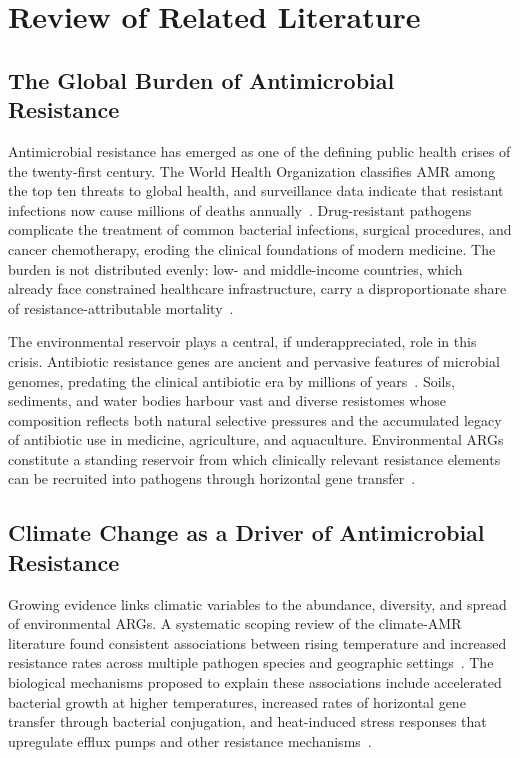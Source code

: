\documentclass[12pt,a4paper]{article}
\begin{document}
\section{Review of Related Literature}\label{rrl}

\subsection{The Global Burden of Antimicrobial Resistance}

Antimicrobial resistance has emerged as one of the defining public health
crises of the twenty-first century.
The World Health Organization classifies AMR among the top ten threats to
global health, and surveillance data indicate that resistant infections now
cause millions of deaths annually~\cite{WHO2023}.
Drug-resistant pathogens complicate the treatment of common bacterial
infections, surgical procedures, and cancer chemotherapy, eroding the
clinical foundations of modern medicine.
The burden is not distributed evenly: low- and middle-income countries,
which already face constrained healthcare infrastructure, carry a
disproportionate share of resistance-attributable mortality~\cite{LancetAMR2024}.

The environmental reservoir plays a central, if underappreciated, role in
this crisis.
Antibiotic resistance genes are ancient and pervasive features of
microbial genomes, predating the clinical antibiotic era by millions of
years~\cite{Allen2010}.
Soils, sediments, and water bodies harbour vast and diverse resistomes
whose composition reflects both natural selective pressures and the
accumulated legacy of antibiotic use in medicine, agriculture, and
aquaculture.
Environmental ARGs constitute a standing reservoir from which
clinically relevant resistance elements can be recruited into pathogens
through horizontal gene transfer~\cite{Partridge2018}.


\subsection{Climate Change as a Driver of Antimicrobial Resistance}

Growing evidence links climatic variables to the abundance, diversity,
and spread of environmental ARGs.
A systematic scoping review of the climate-AMR literature found consistent
associations between rising temperature and increased resistance rates across
multiple pathogen species and geographic
settings~\cite{SalgueiroCernuda2024}.
The biological mechanisms proposed to explain these associations include
accelerated bacterial growth at higher temperatures, increased rates of
horizontal gene transfer through bacterial conjugation, and heat-induced
stress responses that upregulate efflux pumps and other resistance
mechanisms~\cite{LancetWP2025}.
\end{document}
